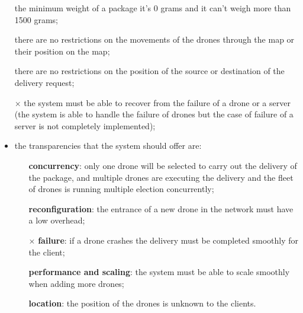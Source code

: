 \documentclass[a4paper, oneside]{memoir}
\begin{document}
\begin{itemize}
\item[\checkmark] the minimum weight of a package it's 0 grams and it can't weigh more than 1500 grams;
\item[\checkmark] there are no restrictions on the movements of the drones through the map or their position on the map;
\item[\checkmark] there are no restrictions on the position of the source or destination of the delivery request;
\item[$\times$] the system must be able to recover from the failure of a drone or a server (the system is able to handle the failure of drones but the case of failure of a server is not completely implemented);

\item the transparencies that the system should offer are:
	\begin{itemize}
	\item[\checkmark] \textbf{concurrency}: only one drone will be selected to carry out the delivery of the package, and multiple drones are executing the delivery and the fleet of drones is running multiple election concurrently;
	\item[\checkmark] \textbf{reconfiguration}: the entrance of a new drone in the network must have a low overhead;
	\item[$\times$] \textbf{failure}: if a drone crashes the delivery must be completed smoothly for the client;
	\item[\checkmark] \textbf{performance and scaling}: the system must be able to scale smoothly when adding more drones;
	\item[\checkmark] \textbf{location}: the position of the drones is unknown to the clients.
	\end{itemize}
\end{itemize}
\end{document}
